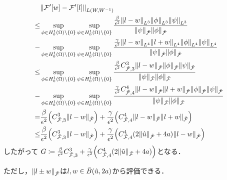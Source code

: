 \begin{align}
  &\norm{\mathcal{F}'\qty[w]-\mathcal{F}'\qty[l]}_{L\qty(W,W^{-1})}\\
  \leq&
  \sup\limits_{\phi \in H^1_0(\Omega) \backslash \{ 0 \} }
  \sup\limits_{\psi \in H^1_0(\Omega) \backslash \{ 0 \} }
  \frac
  {\frac{\beta}{\epsilon^2}\norm{l-w}_{L^3}\norm{\phi}_{L^3}\norm{\psi}_{L^3}}
  {\norm{\psi}_{\tilde{\mathcal{F}}}\norm{\phi}_{\tilde{\mathcal{F}}}}\\
  -&
  \sup\limits_{\phi \in H^1_0(\Omega) \backslash \{ 0 \} }
  \sup\limits_{\psi \in H^1_0(\Omega) \backslash \{ 0 \} }
  \frac
  {\frac{\gamma}{\epsilon^2}\norm{l-w}_{L^4}\norm{l+w}_{L^4}\norm{\phi}_{L^4}\norm{\psi}_{L^4}}
  {\norm{\psi}_{\tilde{\mathcal{F}}}\norm{\phi}_{\tilde{\mathcal{F}}}}\\
  \leq&
  \sup\limits_{\phi \in H^1_0(\Omega) \backslash \{ 0 \} }
  \sup\limits_{\psi \in H^1_0(\Omega) \backslash \{ 0 \} }
  \frac
  {\frac{\beta}{\epsilon^2}C^3_{{\tilde{\mathcal{F}}},3}\norm{l-w}_{\tilde{\mathcal{F}}}\norm{\phi}_{\tilde{\mathcal{F}}}\norm{\psi}_{\tilde{\mathcal{F}}}}
  {\norm{\psi}_{\tilde{\mathcal{F}}}\norm{\phi}_{\tilde{\mathcal{F}}}}\\
  -&
  \sup\limits_{\phi \in H^1_0(\Omega) \backslash \{ 0 \} }
  \sup\limits_{\psi \in H^1_0(\Omega) \backslash \{ 0 \} }
  \frac
  {\frac{\gamma}{\epsilon^2}C^4_{{\tilde{\mathcal{F}}},4}\norm{l-w}_{\tilde{\mathcal{F}}}\norm{l+w}_{\tilde{\mathcal{F}}}\norm{\phi}_{\tilde{\mathcal{F}}}\norm{\psi}_{\tilde{\mathcal{F}}}}
  {\norm{\psi}_{\tilde{\mathcal{F}}}\norm{\phi}_{\tilde{\mathcal{F}}}}\\
  =&
  \frac{\beta}{\epsilon^2}
  \qty(C^3_{{\tilde{\mathcal{F}}},3}\norm{l-w}_{\tilde{\mathcal{F}}})+\frac{\gamma}{\epsilon^2}\qty(C^4_{{\tilde{\mathcal{F}}},4}\norm{l-w}_{\tilde{\mathcal{F}}}\norm{l+w}_{\tilde{\mathcal{F}}})\\
  \leq&
  \frac{\beta}{\epsilon^2}
  \qty(C^3_{{\tilde{\mathcal{F}}},3}\norm{l-w}_{\tilde{\mathcal{F}}})+\frac{\gamma}{\epsilon^2}\qty(C^4_{{\tilde{\mathcal{F}}},4}(2\norm{\hat{u}}_{\tilde{\mathcal{F}}}+4a)\norm{l-w}_{\tilde{\mathcal{F}}})\\
\end{align}
したがって
\(G\coloneqq \frac{\beta}{\epsilon^2}
  C^3_{\tilde{\mathcal{F}},3}+\frac{\gamma}{\epsilon^2}\qty(C^4_{\tilde{\mathcal{F}},4}(2\norm{\hat{u}}_{\tilde{\mathcal{F}}}+4a))\)となる．

ただし，\(\norm{l\pm w}_{\tilde{\mathcal{F}}}\)は\(l,w\in \bar{B}\qty(\hat{u},2a)\)から評価できる．

